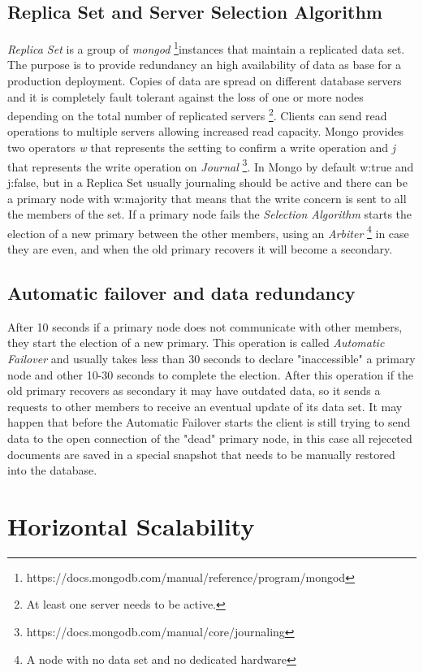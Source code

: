 \subsection{Replica Set and Server Selection Algorithm}
\textit{Replica Set} is a group of \textit{mongod} \footnote{https://docs.mongodb.com/manual/reference/program/mongod}instances that maintain a replicated data set. The purpose is to provide redundancy an high availability of data as base for a production deployment. Copies of data are spread on different database servers and it is completely fault tolerant against the loss of one or more nodes depending on the total number of replicated servers \footnote{At least one server needs to be active.}.
Clients can send read operations to multiple servers allowing increased read capacity. Mongo provides two operators \textit{w} that represents the setting to confirm a write operation and \textit{j} that represents the write operation on \textit{Journal} \footnote{https://docs.mongodb.com/manual/core/journaling}.
In Mongo by default w:true and j:false, but in a Replica Set  usually journaling should be active and there can be a primary node with w:majority that means that the write concern is sent to all the members of the set.
If a primary node fails the \textit{Selection Algorithm} starts the election of  a new primary between the other members, using an \textit{Arbiter} \footnote{A node with no data set and no dedicated hardware} in case they are even, and when the old primary recovers it will become a secondary.

\subsection{Automatic failover and data redundancy}
After 10 seconds if a primary node does not communicate with other members, they start the election of a new primary. This operation is called \textit{Automatic Failover} and usually takes less than 30 seconds to declare "inaccessible" a primary node and other 10-30 seconds to complete the election.
After this operation if the old primary recovers as secondary it may have outdated data, so it sends a requests to other members to receive an eventual update of its data set.
It may happen that before the Automatic Failover starts the client is still trying to send data to the open connection of the "dead" primary node, in this case all rejeceted documents are saved in a special snapshot that needs to be manually restored into the database.

\section{Horizontal Scalability}
\label{sec:6}

